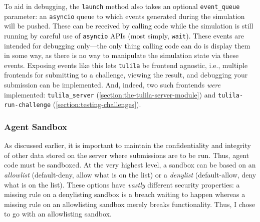 \documentclass[12pt]{article}
\begin{document}
To aid in debugging, the \texttt{launch} method also takes an optional \texttt{event\_queue} parameter: an \texttt{asyncio} queue to which events generated during the simulation will be pushed. These can be received by calling code while the simulation is still running by careful use of \texttt{asyncio} APIs (most simply, \texttt{wait}). These events are intended for debugging only---the only thing calling code can do is display them in some way, as there is no way to manipulate the simulation state via these events. Exposing events like this lets \texttt{tulila} be frontend agnostic, i.e., multiple frontends for submitting to a challenge, viewing the result, and debugging your submission can be implemented. And, indeed, two such frontends \textit{were} implemented: \texttt{tulila\_server} (\cref{section:the-tulila-server-module}) and \texttt{tulila-run-challenge} (\cref{section:testing-challenges}).

\subsubsection{Agent Sandbox}

As discussed earlier, it is important to maintain the confidentiality and integrity of other data stored on the server where submissions are to be run. Thus, agent code must be sandboxed. At the very highest level, a sandbox can be based on an \textit{allowlist} (default-deny, allow what is on the list) or a \textit{denylist} (default-allow, deny what is on the list). These options have \textit{vastly} different security properties: a missing rule on a denylisting sandbox is a breach waiting to happen whereas a missing rule on an allowlisting sandbox merely breaks functionality. Thus, I chose to go with an allowlisting sandbox.
\end{document}
